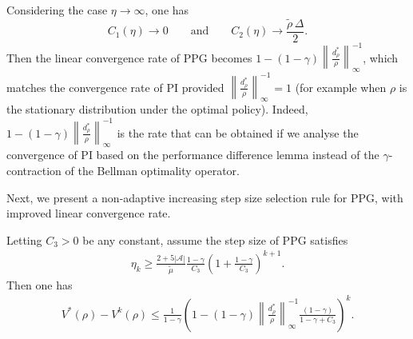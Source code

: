 \begin{remark} Considering the  case $\eta \rightarrow \infty$, one has
$$
C_1\left( \eta \right) \rightarrow 0\qquad \mathrm{and}\qquad C_2\left( \eta \right) \rightarrow \frac{\tilde{\rho}\,\Delta }{2}.
$$    
Then the linear convergence rate of PPG becomes
 $1-(1-\gamma )\left\| \frac{d_{\rho}^{*}}{\rho} \right\| _{\infty}^{-1}$,
which matches the convergence rate of PI provided $\left\| \frac{d_{\rho}^{*}}{\rho} \right\| _{\infty}^{-1}=1$ \textup{(}for example when $\rho$ is the stationary distribution under the optimal policy\textup{)}. Indeed, $1-(1-\gamma )\left\| \frac{d_{\rho}^{*}}{\rho} \right\| _{\infty}^{-1}$ is the rate that can be obtained if we analyse the convergence of PI based on the performance difference lemma instead of the  $\gamma$-contraction of the Bellman optimality operator.
\end{remark}
Next, we present a non-adaptive increasing step size selection rule for PPG, with improved linear convergence rate.
\begin{theorem}\label{thm:PPG-linear-adaptive}
    Letting $C_3>0$ be any constant, assume the step size of PPG satisfies \begin{align*}
\eta_k\geq \frac{2+5|\mathcal{A}|}{\tilde{\mu}}\frac{1-\gamma}{C_3}\left(1+\frac{1-\gamma}{C_3}\right)^{k+1}.
\end{align*}
 Then one has
\begin{align*}
V^*(\rho) - V^k(\rho)\leq \frac{1}{1-\gamma}\left(1-(1-\gamma)\left\|\frac{d_\rho^*}{\rho}\right\|_\infty^{-1}\frac{(1-\gamma)}{1-\gamma+C_3}\right)^k.
\end{align*}
\end{theorem}

